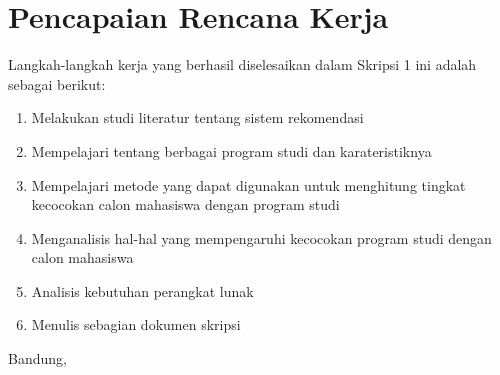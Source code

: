 \documentclass[a4paper,twoside]{article}
\begin{document}
\section{Pencapaian Rencana Kerja}
Langkah-langkah kerja yang berhasil diselesaikan dalam Skripsi 1 ini adalah sebagai berikut:
\begin{enumerate}
\item Melakukan studi literatur tentang sistem rekomendasi
\item Mempelajari tentang berbagai program studi dan karateristiknya
\item Mempelajari metode yang dapat digunakan untuk menghitung tingkat kecocokan calon mahasiswa dengan program studi
\item Menganalisis hal-hal yang mempengaruhi kecocokan program studi dengan calon mahasiswa
\item Analisis kebutuhan perangkat lunak
\item Menulis sebagian dokumen skripsi
\end{enumerate}




\vspace{1cm}
\centering Bandung, \tanggal\\
\vspace{2cm} \nama \\ 
\vspace{1cm}
\end{document}
